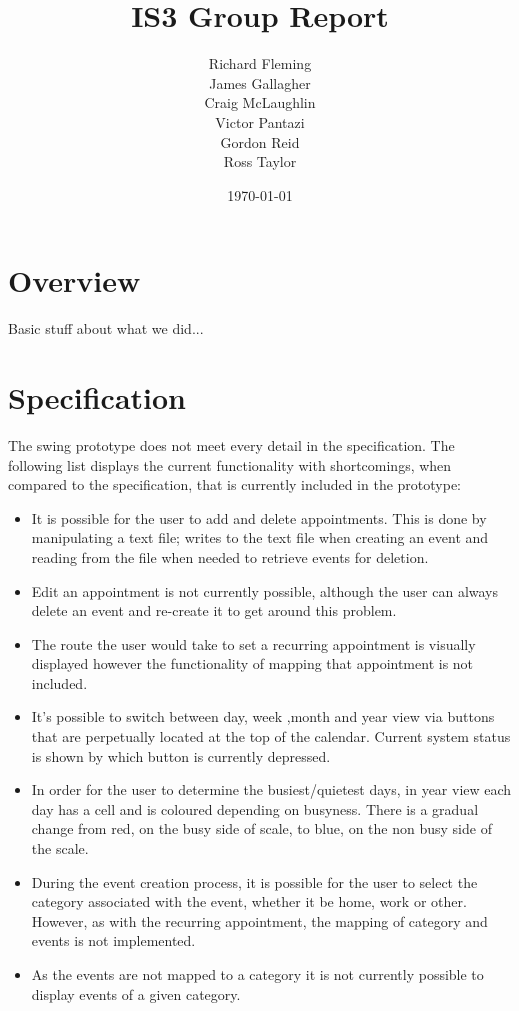 \documentclass{article}
\title{IS3 Group Report}
\author{
  Richard Fleming \\
  James Gallagher \\
  Craig McLaughlin \\
  Victor Pantazi \\
  Gordon Reid \\
  Ross Taylor}
\date{\today}
\begin{document}

\maketitle


\section{Overview}

Basic stuff about what we did...

\section{Specification}
The swing prototype does not meet every detail in the specification.
        The following list displays the current functionality with shortcomings,
        when compared to the specification, that is currently included in the
        prototype:
        \begin{itemize}
       
        \item It is possible for the user to add and delete appointments. This is
        done by manipulating a text file; writes to the text file when creating an
         event and reading from the file when needed to retrieve events for deletion.
        \item Edit an appointment is not currently possible, although the user can
        always delete an event and re-create it to get around this problem.
        \item The route the user would take to set a recurring appointment is
        visually displayed however the functionality of mapping that appointment
        is not included.
        \item It's possible to switch between day, week ,month and year view
        via buttons that are perpetually located at the top of the calendar. Current
        system status is shown by which button is currently depressed.
        \item In order for the user to determine the busiest/quietest days, in year
        view each day has a cell and is coloured depending on busyness. There is a
        gradual change from red, on the busy side of scale, to blue, on the non busy
        side of the scale.
        \item  During the event creation process, it is possible for the user to
        select the category associated with the event, whether it be home, work or
        other. However, as with the recurring appointment, the mapping of category
        and events is not implemented.
        \item As the events are not mapped to a category it is not currently
        possible to display events of a given category.

        \end{itemize}
\end{document}
